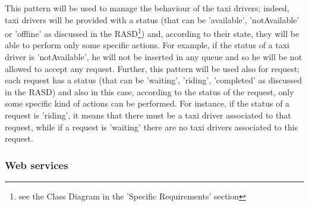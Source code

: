     This pattern will be used to manage the behaviour of the taxi drivers; indeed, taxi drivers will be provided with a status (that can be 'available', 'notAvailable' or 'offline' as discussed in the RASD\footnote{\label{note1}see the Class Diagram in the 'Specific Requirements' section}) and, according to their state, they will be able to perform only some specific actions.
    For example, if the status of a taxi driver is 'notAvailable', he will not be inserted in any queue and so he will be not allowed to accept any request.
    \newline
    Further, this pattern will be used also for request; each request has a status (that can be 'waiting', 'riding', 'completed' as discussed in the RASD\footnotemark[\ref{note1}]) and also in this case, according to the status of the request, only some specific kind of actions can be performed. For instance, if the status of a request is 'riding', it means that there must be a taxi driver associated to that request, while if a request is 'waiting' there are no taxi drivers associated to this request.

\subsubsection{Web services}